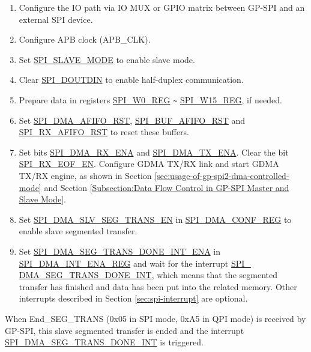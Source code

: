 \documentclass[main\_\_EN.tex]{subfiles}
\begin{document}
\begin{enumerate}
   \item  Configure the IO path via IO MUX or GPIO matrix between GP-SPI and an external SPI device.

   \item Configure APB clock (APB\_CLK).

    \item Set \hyperref[fielddesc:SPISLAVEMODE]{SPI\_SLAVE\_MODE} to enable slave mode.

    \item Clear \hyperref[fielddesc:SPIDOUTDIN]{SPI\_DOUTDIN} to enable half-duplex communication.

    \item Prepare data in registers \hyperref[regdesc:SPIW0REG]{SPI\_W0\_REG} \verb+~+ \hyperref[regdesc:SPIW15REG]{SPI\_W15\_REG}, if needed.

    \item Set \hyperref[fielddesc:SPIDMAAFIFORST]{SPI\_DMA\_AFIFO\_RST}, \hyperref[fielddesc:SPIBUFAFIFORST]{SPI\_BUF\_AFIFO\_RST} and \hyperref[fielddesc:SPIRXAFIFORST]{SPI\_RX\_AFIFO\_RST} to reset these buffers.

    \item Set bits \hyperref[fielddesc:SPIDMARXENA]{SPI\_DMA\_RX\_ENA} and \hyperref[fielddesc:SPIDMATXENA]{SPI\_DMA\_TX\_ENA}. Clear the bit \hyperref[fielddesc:SPIRXEOFEN]{SPI\_RX\_EOF\_EN}. Configure GDMA TX/RX link and start GDMA TX/RX engine, as shown in Section \ref{sec:usage-of-gp-spi2-dma-controlled-mode} and Section \ref{Subsection:Data Flow Control in GP-SPI Master and Slave Mode}.

    \item Set \hyperref[fielddesc:SPIDMASLVSEGTRANSEN]{SPI\_DMA\_SLV\_SEG\_TRANS\_EN} in \hyperref[regdesc:SPIDMACONFREG]{SPI\_DMA\_CONF\_REG} to enable slave segmented transfer.

    \item Set \hyperref[fielddesc:SPIDMASEGTRANSDONEINTENA]{SPI\_DMA\_SEG\_TRANS\_DONE\_INT\_ENA} in \hyperref[regdesc:SPIDMAINTENAREG]{SPI\_DMA\_INT\_ENA\_REG} and wait for the interrupt \hyperref[int:SPIDMASEGTRANSDONEINT]{SPI\_\\DMA\_SEG\_TRANS\_DONE\_INT}, which means that the segmented transfer has finished and data has been put into the related memory. Other interrupts described in Section \ref{sec:spi-interrupt} are optional.
\end{enumerate}

When End\_SEG\_TRANS (0x{}05 in SPI mode, 0x{}A5 in QPI mode) is received by GP-SPI, this slave segmented transfer is ended and the interrupt \hyperref[int:SPIDMASEGTRANSDONEINT]{SPI\_DMA\_SEG\_TRANS\_DONE\_INT} is triggered.
\end{document}
